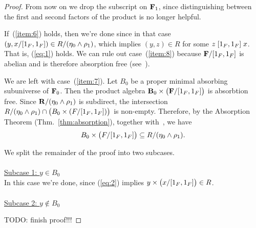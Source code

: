 \begin{proof}
From now on we drop the subscript on $\mathbf{F}_1$, since distinguishing between the
first and second factors of the product is no longer helpful. 


If~(\ref{item:6}) holds, then we're done since in that case
$(y, x/[1_{F},1_{F}]) \in R/(\eta_0 \wedge \rho_1)$,
which implies $(y, z) \in R$ for some $z \mathrel{[1_{F}, 1_{F}]} x$.
That is, (\ref{eq:1}) holds.
We can rule out case~(\ref{item:8}) because $\mathbf{F}/[1_{F}, 1_{F}]$ is abelian and
is therefore absorption free (see~\cite{MR3374664}).  %


We are left with case~(\ref{item:7}).
Let $B_0$ be a proper minimal absorbing subuniverse of $\mathbf{F}_0$.
Then the product algebra $\mathbf{B}_0\times \bigl(\mathbf{F}/[1_{F}, 1_{F}]\bigr)$ is
absorbtion free.
Since $\mathbf{R}/(\eta_0 \wedge \rho_1)$ is subdirect, the intersection
$R/(\eta_0 \wedge \rho_1) \cap \bigl(B_0 \times (F/[1_{F}, 1_{F}])\bigr)$ is
non-empty. Therefore, by the Absorption Theorem (Thm.~\ref{thm:absorption}),
together with~\cite[Lemmas~4.7, 4.9, 4.11, 4.12]{Bergman-DeMeo-2016},
we have
\begin{equation}
  \label{eq:2}
B_0 \times \bigl(F/[1_{F}, 1_{F}]\bigr) \subseteq R/(\eta_0 \wedge \rho_1).
\end{equation}

We split the remainder of the proof into two subcases.\\
\\
\noindent \underline{Subcase 1: $y\in B_0$}\\[5pt]
In this case we're done, since (\ref{eq:2}) implies
${y} \times \bigl(x/[1_{F}, 1_{F}]\bigr) \in R$.\\
\\
\noindent \underline{Subcase 2: $y\notin B_0$}\\[5pt]

\bigskip

\noindent TODO: finish proof!!!

\vfill

\end{proof}
\newpage

